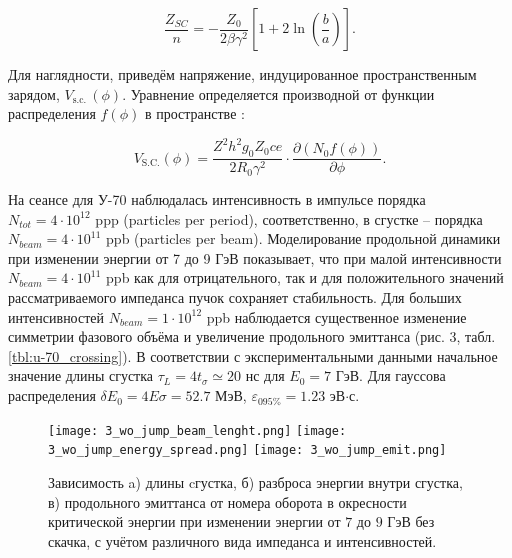 \begin{equation}
\frac{Z_{SC}}{n}=-\frac{Z_0}{2\beta\gamma^2}\left[1+2\ln{\left(\frac{b}{a}\right)}\right].
\label{sc}
\end{equation}

\noindent Для наглядности, приведём напряжение, индуцированное про\-стран\-стве\-нным зарядом, $V_{\mathrm{s.c.\ }}(\phi)$. Уравнение определяется производной от функции распределения $f(\phi)$ в пространстве \cite{sc}:

\begin{equation} \label{V_sc}
V_{\text{S.C.}}\left(\phi\right)=\frac{Z^2h^2g_0Z_0ce}{2R_0\gamma^2}\cdot\frac{\partial\left(N_0f\left(\phi\right)\right)}{\partial\phi}.
\end{equation}

\par На сеансе для У-70 наблюдалась интенсивность в импульсе порядка $N_{tot}=4\cdot{10}^{12}$ ppp (particles per period), соответственно, в сгустке – порядка $N_{beam}=4\cdot{10}^{11}$ ppb (particles per beam). Моделирование продольной динамики при изменении энергии от 7 до 9 ГэВ показывает, что при малой интенсивности $N_{beam}=4\cdot{10}^{11}$ ppb как для отрицательного, так и для положительного значений рассматриваемого импеданса пучок сохраняет стабильность. Для больших интенсивностей $N_{beam}=1\cdot{10}^{12}$ ppb наблюдается существенное изменение симметрии фазового объёма и увеличение продольного эмиттанса (рис. 3, табл. \ref{tbl:u-70_crossing}). В соответствии с экспериментальными данными начальное значение длины сгустка $\tau_L=4t_\sigma\simeq20$ нс для $E_0=7$ ГэВ. Для гауссова распределения $\delta E_{0} = 4E \sigma = 52.7$ МэВ, $\varepsilon_{0 95\%}=1.23$ эВ$\cdot$с.
	
\begin{figure} [h!]
   \texttt{[image: 3\_wo\_jump\_beam\_lenght.png]}
   \texttt{[image: 3\_wo\_jump\_energy\_spread.png]}
   \texttt{[image: 3\_wo\_jump\_emit.png]}
   \caption{Зависимость a) длины cгустка, б) разброса энергии внутри сгустка, в) продольного эмиттанса от номера оборота в окресности критической энергии при изменении энергии от $7$ до $9$ ГэВ без скачка, с учётом различного вида импеданса и интенсивностей.}
   \label{fig:3_wo_jump}
\end{figure}

